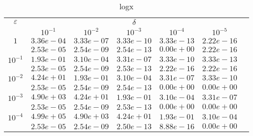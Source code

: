 \documentclass[10pt,twoside]{uz_kgu}
\begin{document}
\begin{table} [!htb]
	\caption {logx}
	\begin{center}
		\begin{tabular}{|c|c|c|c|c|c|c}
			\cline{1-6} $\varepsilon$ & \multicolumn{5}{c|}{$\delta$} \\
			\cline{2-6} &$10^{-1}$ & $10^{-2}$ & $10^{-3}$  & $10^{-4}$& $10^{-5}$\\
			\cline{1-6}
			$1$
			&$3.36e-04$&$3.33e-07$&$3.33e-10$&$3.33e-13$& $2.22e-16$\\
			&$2.53e-05$&$2.54e-09$&$2.54e-13$&$0.00e+00$& $2.22e-16$\\
			\cline{1-6}
			$10^{-1}$
			&$1.93e-01$&$3.10e-04$&$3.31e-07$&$3.33e-10$&$3.33e-13$\\
			&$2.53e-05$&$2.54e-09$&$2.53e-13$&$2.22e-16$&$2.22e-16$\\
			\cline{1-6}
			$10^{-2}$
			&$4.24e+01$&$1.93e-01$&$3.10e-04$&$3.31e-07$&$3.33e-10$\\
			&$2.53e-05$&$2.54e-09$&$2.54e-13$&$0.00e+00$&$0.00e+00$\\
			\cline{1-6}
			$10^{-3}$
			&$4.90e+03$&$4.24e+01$&$1.93e-01$&$3.10e-04$&$3.31e-07$\\
			&$2.53e-05$&$2.54e-09$&$2.53e-13$&$0.00e+00$&$0.00e+00$\\
			\cline{1-6}
			$10^{-4}$
			&$4.99e+05$&$4.90e+03$&$4.24e+01$&$1.93e-01$&$3.10e-04$\\
			&$2.53e-05$&$2.54e-09$&$2.50e-13$&$8.88e-16$&$0.00e+00$\\
			\cline{1-6}
		\end{tabular}
	\end{center}
\end{table}
\end{document}
